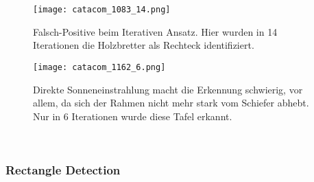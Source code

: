\begin{SCfigure}[1][h!]
\caption{Falsch-Positive beim Iterativen Ansatz. Hier wurden in 14 Iterationen die Holzbretter als Rechteck identifiziert.}
\texttt{[image: catacom\_1083\_14.png]}
\end{SCfigure}
\begin{SCfigure}[1][h!]
\caption{Direkte Sonneneinstrahlung macht die Erkennung schwierig, vor allem, da sich der Rahmen nicht mehr stark vom Schiefer abhebt. Nur in 6 Iterationen wurde diese Tafel erkannt.}
\texttt{[image: catacom\_1162\_6.png]}
\end{SCfigure}\\

\subsubsection{Rectangle Detection}

